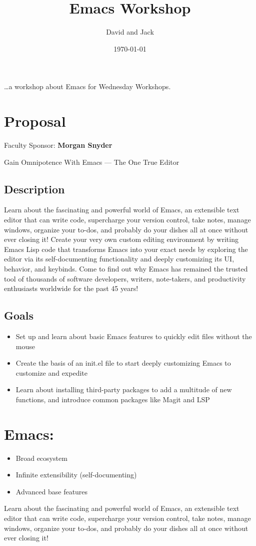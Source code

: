 \documentclass[letterpaper]{article}
\author{David and Jack}
\date{\today}
\title{Emacs Workshop}
\renewcommand{\tableofcontents}{}
\begin{document}
\tableofcontents

\ldots{}a workshop about Emacs for Wednesday Workshops.


\section{Proposal}
\label{sec:org5e3ce0a}
Faculty Sponsor: \textbf{\textbf{Morgan Snyder}}

Gain Omnipotence With Emacs — The One True Editor

\subsection{Description}
\label{sec:orgf8c4206}
Learn about the fascinating and powerful world of Emacs, an extensible
text editor that can write code, supercharge your version control,
take notes, manage windows, organize your to-dos, and probably do your
dishes all at once without ever closing it! Create your very own
custom editing environment by writing Emacs Lisp code that transforms
Emacs into your exact needs by exploring the editor via its
self-documenting functionality and deeply customizing its UI,
behavior, and keybinds. Come to find out why Emacs has remained the
trusted tool of thousands of software developers, writers,
note-takers, and productivity enthusiasts worldwide for the past 45
years!

\subsection{Goals}
\label{sec:org9ef4410}
\begin{itemize}
\item Set up and learn about basic Emacs features to quickly edit files without the mouse
\item Create the basis of an init.el file to start deeply customizing Emacs to customize and expedite
\item Learn about installing third-party packages to add a multitude of new functions, and introduce common packages like Magit and LSP
\end{itemize}


\section{Emacs:}
\label{sec:org7110cc2}
\begin{itemize}
\item Broad ecosystem
\item Infinite extensibility (self-documenting)
\item Advanced base features
\end{itemize}

Learn about the fascinating and powerful world of Emacs, an extensible text editor that can write code, supercharge your version control, take notes, manage windows, organize your to-dos, and probably do your dishes all at once without ever closing it! 
\end{document}
